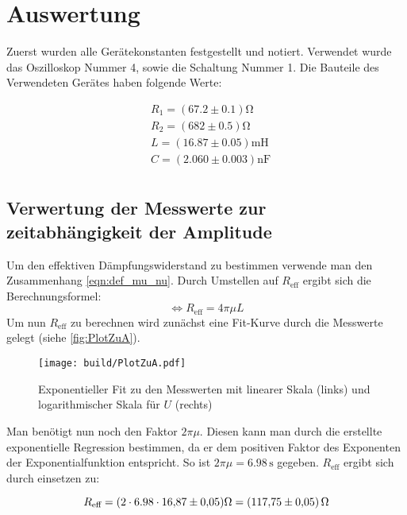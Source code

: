 \section{Auswertung}
\label{sec:Auswertung}

Zuerst wurden alle Gerätekonstanten festgestellt und notiert. Verwendet wurde das Oszilloskop Nummer 4, sowie
die Schaltung Nummer 1. Die Bauteile des Verwendeten Gerätes haben folgende Werte:

\begin{align*}
  &R_1 = (67.2 \pm 0.1) \unit{\ohm} \\
  &R_2 = (682 \pm 0.5) \unit{\ohm}  \\
  &L   = (16.87 \pm 0.05) \unit{\milli\henry} \\
  &C   = (2.060 \pm 0.003) \unit{\nano\farad} \\
\end{align*}

\subsection{Verwertung der Messwerte zur zeitabhängigkeit der Amplitude}
\label{subsec:AuswertungA}

Um den effektiven Dämpfungswiderstand zu bestimmen verwende man den Zusammenhang \eqref{eqn:def_mu_nu}.
Durch Umstellen auf $R_{\text{eff}}$ ergibt sich die Berechnungsformel:
\begin{equation}
  \label{Abklingdauer1}
  \Longleftrightarrow R_{\text{eff}} = 4\pi\mu L
\end{equation}
Um nun $R_{\text{eff}}$ zu berechnen wird zunächst eine Fit-Kurve durch die Messwerte gelegt (siehe \autoref{fig:PlotZuA}).

\begin{figure}
  \centering
  \texttt{[image: build/PlotZuA.pdf]}
  \caption{Exponentieller Fit zu den Messwerten mit linearer Skala (links) und logarithmischer Skala für $U$ (rechts)}
  \label{fig:PlotZuA}
\end{figure}

Man benötigt nun noch den Faktor $2\pi\mu$. Diesen kann man durch die erstellte exponentielle Regression 
bestimmen, da er dem positiven Faktor des Exponenten der Exponentialfunktion entspricht. 
So ist $2\pi\mu = 6.98\,\unit{\second}$ gegeben.
$R_{\text{eff}}$ ergibt sich durch einsetzen zu:

\begin{equation*}
  R_{\text{eff}} = (2\cdot 6.98\cdot \num{16.87\pm 0.05}) \unit{\ohm} = (\num{117.75 \pm 0.05})\,\unit{\ohm}
\end{equation*}

